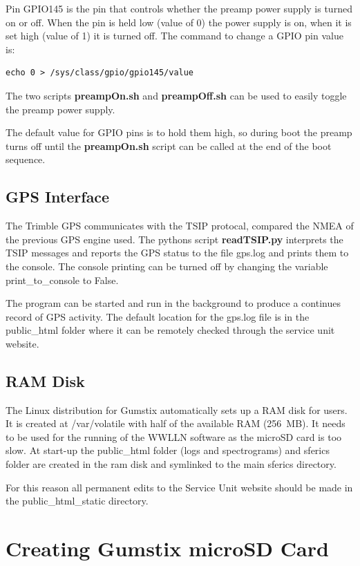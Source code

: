 Pin GPIO145 is the pin that controls whether the preamp power supply is turned on or off.
When the pin is held low (value of 0) the power supply is on, when it is set high (value of 1) it is turned off.
The command to change a GPIO pin value is:

\begin{verbatim}
echo 0 > /sys/class/gpio/gpio145/value
\end{verbatim}

The two scripts {\bf preampOn.sh} and {\bf preampOff.sh} can be used to easily toggle the preamp power supply.

The default value for GPIO pins is to hold them high, so during boot the preamp turns off until the {\bf preampOn.sh} script can be called at the end of the boot sequence.

\subsection{GPS Interface}

The Trimble GPS communicates with the TSIP protocal, compared the NMEA of the previous GPS engine used.
The pythons script {\bf readTSIP.py} interprets the TSIP messages and reports the GPS status to the file gps.log and prints them to the console.
The console printing can be turned off by changing the variable print\_to\_console to False.

The program can be started and run in the background to produce a continues record of GPS activity.
The default location for the gps.log file is in the public\_html folder where it can be remotely checked through the service unit website.

\subsection{RAM Disk}

The Linux distribution for Gumstix automatically sets up a RAM disk for users.
It is created at /var/volatile with half of the available RAM (256~MB).
It needs to be used for the running of the WWLLN software as the microSD card is too slow.
At start-up the public\_html folder (logs and spectrograms) and sferics folder are created in the ram disk and symlinked to the main sferics directory.

For this reason all permanent edits to the Service Unit website should be made in the public\_html\_static directory.

\section{Creating Gumstix microSD Card}

